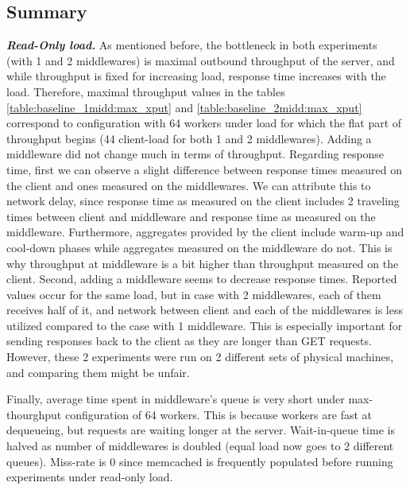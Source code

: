 \documentclass[11pt,a4paper]{article}
\begin{document}
\subsection{Summary}

\textit{\textbf{Read-Only load.}} As mentioned before, the bottleneck in both experiments (with 1 and 2 middlewares) is maximal outbound throughput of the server, and while throughput is fixed for increasing load, response time increases with the load. Therefore, maximal throughput values in the tables \ref{table:baseline_1midd:max_xput} and \ref{table:baseline_2midd:max_xput} correspond to configuration with 64 workers under load for which the flat part of throughput begins (44 client-load for both 1 and 2 middlewares). Adding a middleware did not change much in terms of throughput. Regarding response time, first we can observe a slight difference between response times measured on the client and ones measured on the middlewares. We can attribute this to network delay, since response time as measured on the client includes 2 traveling times between client and middleware and response time as measured on the middleware. Furthermore, aggregates provided by the client include warm-up and cool-down phases while aggregates measured on the middleware do not. This is why throughput at middleware is a bit higher than throughput measured on the client. Second, adding a middleware seems to decrease response times. Reported values occur for the same load, but in case with 2 middlewares, each of them receives half of it, and network between client and each of the middlewares is less utilized compared to the case with 1 middleware. This is especially important for sending responses back to the client as they are longer than GET requests. However, these 2 experiments were run on 2 different sets of physical machines, and comparing them might be unfair.

Finally, average time spent in middleware's queue is very short under max-thourghput configuration of 64 workers. This is because workers are fast at dequeueing, but requests are waiting longer at the server. Wait-in-queue time is halved as number of middlewares is doubled (equal load now goes to 2 different queues). Miss-rate is 0 since memcached is frequently populated before running experiments under read-only load.
\end{document}
